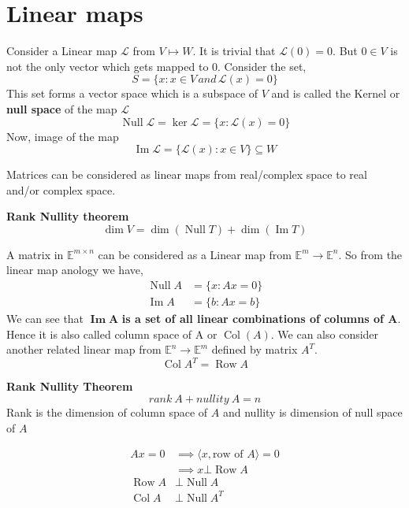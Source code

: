 \section{Linear maps}
\begin{slide}
Consider a Linear map $\mathcal{L}$ from $V \mapsto W$.
It is trivial that $\mathcal{L}(0)=0$. But $0\in V$ is not the only vector which gets mapped to $0$. Consider the set,
$$S = \{x: x\in V \,and\, \mathcal{L}(x) = {0}\}$$
This set forms a vector space which is a subspace of $V$ and is called the Kernel or \textbf{null space} of the map $\mathcal{L}$
$$\operatorname{Null} \mathcal{L} = \operatorname{ker} \mathcal{L} = \{x: \mathcal{L}(x)=0\}$$
Now, image of the map
$$\operatorname{Im} \mathcal{L} = \{\mathcal{L}(x): x\in V\}\subseteq W$$

Matrices can be considered as linear maps from real/complex space to real and/or complex space. 

\textbf{Rank Nullity theorem}
$$\operatorname{dim} V = \operatorname{dim}(\operatorname{Null} T) + \operatorname {dim}  (\operatorname{Im} T)$$
\end{slide}

\begin{slide}
A matrix in $\mathbb{E}^{m\times n}$ can be considered as a Linear map from $\mathbb{E}^{m} \to \mathbb{E}^{n}$. So from the linear map anology we have, 
\begin{align*}
	\operatorname{Null} A &= \{x: Ax = 0\}
	\\
	\operatorname{Im}A & = \{b: Ax=b\}
\end{align*}
We can see that $\operatorname{\mathbf{ Im}} \mathbf{A}$  \textbf{is a set of all linear combinations of columns of A}. Hence it is also called column space of A or $\operatorname{Col}(A)$.
We can also consider another related linear map from $\mathbb{E}^{n} \to \mathbb{E}^{m}$ defined by matrix $A^T$. 
$$\operatorname{Col}A^T = \operatorname{Row}A$$
\begin{multicols}{2}
\textbf{Rank Nullity Theorem}
$$rank~A+ nullity~A = n$$
Rank is the dimension of column space of $A$ and nullity is dimension of null space of $A$

\begin{align*}
Ax=0 &\implies \langle x,\text{row of }A\rangle = 0 
\\
&\implies x \bot \operatorname{Row} A
\\
\operatorname{Row} A &\bot \operatorname{Null} A
\\
\operatorname{Col} A &\bot \operatorname{Null} A^T
\end{align*}

\end{multicols}
\end{slide}
